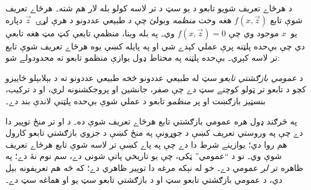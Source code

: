 \documentclass[../../../include/open-logic-section]{subfiles}
\begin{document}

د هرځاے تعريف شويو تابعو د يو سټ د تر لاسه کولو بله لار هم شته۔
هرځاے تعريف شوې تابع $f(x,\vec z)$ هغه وخت \emph{منظمه} وبولئ چې د
طبيعي عددونو د هرې لړۍ~$\vec z$ دپاره يو~$x$ موجود وي چې
$f(x,\vec z)=0$ وي۔ په بله وينا، منظمې تابعې کټ مټ هغه تابعې دي چې
بې‌حده پلټنه پرې عملي کېدے شي او په پايله کښې يوه هرځاے تعريف شوې
تابع تر لاسه کېږي۔ بې‌حده پلټنه په محتاط ډول يوازې منظمو تابعو ته
محدودولے شو:

\begin{defn}
د \emph{عمومي بازګشتي تابعو} سټ له طبيعي عددونو څخه طبيعي عددونو ته د
بېلابېلو ځاييزو کچو د تابعو تر ټولو کوچنے سټ دے چې صفر، جانشين او
پروجکشنونه لري، او د ترکيب، بنسټيز بازګښت او پر \emph{منظمو} تابعو د
عملي شوې بې‌حده پلټنې لاندې بند دے۔
\end{defn}

په څرګند ډول هره عمومي بازګشتي تابع هرځاے تعريف شوې ده۔ د
 او  تر
منځ توپير دا دے چې په وروستي تعريف کښې د جوړونې په منځ کښې د جزوي
بازګشتي تابعو کارول هم روا دي؛ يوازينے شرط دا دے چې په پاے کښې تر لاسه
شوې تابع هرځاے تعريف شوې وي۔ نو د ``عمومي'' ټکی، چې يو تاريخي پاتې
شونی دے، سم نوم نۀ دے؛ په ظاهره  تر
 \emph{لږ} عمومي دے۔ خو له نېکه مرغه دا
توپير ظاهري دے؛ که څه هم تعريفونه بېل دي، د عمومي بازګشتي تابعو سټ او
د بازګشتي تابعو سټ يو او هماغه سټ دے۔
\end{document}
